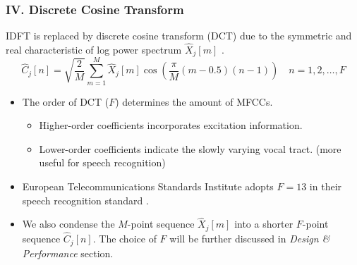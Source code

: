 \begin{frame}
\frametitle{IV. Discrete Cosine Transform}
IDFT is replaced by discrete cosine transform (DCT) due to the symmetric and real characteristic of log power spectrum $\hat{X}_j[m]$ \cite{picone1993signal, iser2008bandwidth}.
\begin{equation}
\hat{C}_j[n] = \sqrt{\frac{2}{M}} \sum^{M}_{m=1} \hat{X}_j[m] \cos \left( \frac{\pi}{M} (m - 0.5) (n-1) \right) \quad n = 1, 2, \dots, F
\end{equation}

\begin{itemize}
	\item The order of DCT ($F$) determines the amount of MFCCs. \cite{tan2008automatic}
	\begin{itemize}
		\item Higher-order coefficients incorporates excitation information.
		\item Lower-order coefficients indicate the slowly varying vocal tract. (more useful for speech recognition)
	\end{itemize}
	\item European Telecommunications Standards Institute adopts $F = 13$ in their speech recognition standard \cite{etsi2001202}.
	\item We also condense the $M$-point sequence $\hat{X}_j[m]$ into a shorter $F$-point sequence $\hat{C}_j[n]$. The choice of $F$ will be further discussed in \textit{Design \& Performance} section.
\end{itemize}
\end{frame}
